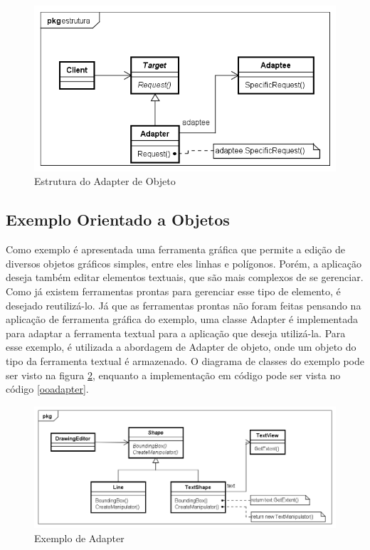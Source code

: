 \begin{figure}[htb]
	\caption{\label{adapter_alt_struct}Estrutura do Adapter de Objeto}
	\begin{center}
	    \includegraphics[scale=0.5]{5_padroes-contexto-funcional/5.2_estruturais/5.2.1_adapter/adapter_objeto_estrutura.png}
	\end{center}
\end{figure}

\subsection*{Exemplo Orientado a Objetos}

Como exemplo é apresentada uma ferramenta gráfica 
que permite a edição de diversos objetos gráficos 
simples, entre eles linhas e polígonos. Porém, 
a aplicação deseja também editar elementos textuais, 
que são mais complexos de se gerenciar. Como já existem 
ferramentas prontas para gerenciar esse tipo de 
elemento, é desejado reutilizá-lo. Já que as 
ferramentas prontas não foram feitas pensando na 
aplicação de ferramenta gráfica do exemplo, uma 
classe Adapter é implementada para adaptar a 
ferramenta textual para a aplicação que deseja 
utilizá-la. Para esse exemplo, é utilizada a 
abordagem de Adapter de objeto, onde um objeto 
do tipo da ferramenta textual é armazenado. O 
diagrama de classes do exemplo pode ser visto na 
figura \ref{adapter_exemplo}, enquanto a 
implementação em código pode ser vista no código 
\ref{ooadapter}.


\begin{figure}[htb]
	\caption{\label{adapter_exemplo}Exemplo de Adapter}
	\begin{center}
	    \includegraphics[scale=0.5]{5_padroes-contexto-funcional/5.2_estruturais/5.2.1_adapter/adapter_exemplo.png}
	\end{center}
\end{figure}


